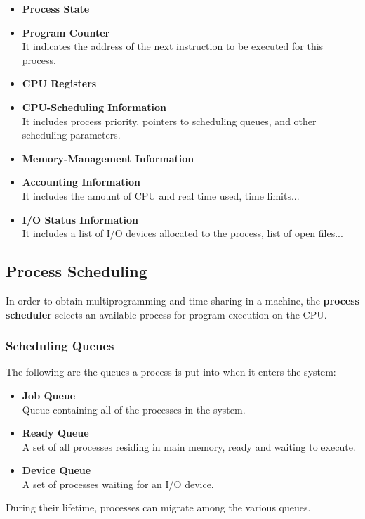 \documentclass{article}
\begin{document}
\begin{itemize}
	\item \textbf{Process State}
	
	\item \textbf{Program Counter}
	\vspace{.2cm} \\
	It indicates the address of the next instruction to be executed for this process.
	
	\item \textbf{CPU Registers}
	
	\item \textbf{CPU-Scheduling Information}
	\vspace{.2cm} \\
	It includes process priority, pointers to scheduling queues, and other scheduling parameters.
	
	\item \textbf{Memory-Management Information}
	
	\item \textbf{Accounting Information}
	\vspace{.2cm} \\
	It includes the amount of CPU and real time used, time limits...
	
	\item \textbf{I/O Status Information}
	\vspace{.2cm} \\
	It includes a list of I/O devices allocated to the process, list of open files...
\end{itemize}

\subsection{Process Scheduling}
In order to obtain multiprogramming and time-sharing in a machine, the \textbf{process scheduler} selects an available process for program execution on the CPU.

\subsubsection{Scheduling Queues}
The following are the queues a process is put into when it enters the system:

\begin{itemize}
	\item \textbf{Job Queue}
	\vspace{.2cm} \\
	Queue containing all of the processes in the system.
	
	\item \textbf{Ready Queue}
	\vspace{.2cm} \\
	A set of all processes residing in main memory, ready and waiting to execute.
	
	\item \textbf{Device Queue}
	\vspace{.2cm} \\
	A set of processes waiting for an I/O device.
\end{itemize}
During their lifetime, processes can migrate among the various queues.
\end{document}
